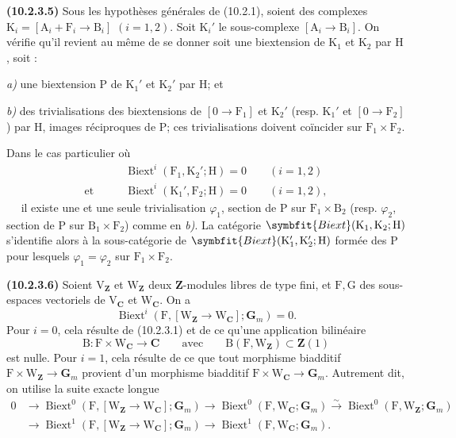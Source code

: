\documentclass[11pt,leqno]{article}
\newcommand{\Page}[1]{\ifvmode\noindent\else\unskip\ \fi{\footnotesize\textcolor{gray}{[p.\,#1]}}\ \ignorespaces}
\begin{document}
\textbf{(10.2.3.5)} Sous les hypothèses générales de (10.2.1), soient
des complexes
\(\mathrm{K}_i=[\mathrm{A}_i+\mathrm{F}_i\to\mathrm{B}_i]\)
\((i=1,2)\). Soit \(\mathrm{K}_i'\) le sous-complexe
\([\mathrm{A}_i\to\mathrm{B}_i]\). On vérifie qu’il revient au même
de se donner soit une biextension de \(\mathrm{K}_1\) et
\(\mathrm{K}_2\) par \(\mathrm{H}\), soit :

\noindent\textit{a)} une biextension \(\mathrm{P}\) de
\(\mathrm{K}_1'\) et \(\mathrm{K}_2'\) par \(\mathrm{H}\); et

\noindent\textit{b)} des trivialisations des biextensions de
\([0\to\mathrm{F}_1]\) et \(\mathrm{K}_2'\)
(resp. \(\mathrm{K}_1'\) et \([0\to\mathrm{F}_2]\)) par
\(\mathrm{H}\), images réciproques de \(\mathrm{P}\); ces
trivialisations doivent coïncider sur
\(\mathrm{F}_1\times\mathrm{F}_2\).

Dans le cas particulier où
\begin{align*}
&\operatorname{Biext}^{i}(\mathrm{F}_1,\mathrm{K}_2';\mathrm{H})=0
\qquad(i=1,2)\\
\text{et}\qquad&
\operatorname{Biext}^{i}(\mathrm{K}_1',\mathrm{F}_2;\mathrm{H})=0
\qquad(i=1,2),
\end{align*}
\Page{62}
il existe une et une seule trivialisation \(\varphi_1\), section de
\(\mathrm{P}\) sur \(\mathrm{F}_1\times\mathrm{B}_2\)
(resp. \(\varphi_2\), section de \(\mathrm{P}\) sur
\(\mathrm{B}_1\times\mathrm{F}_2\)) comme en \textit{b)}.
La catégorie
\(\symbfit{Biext}(\mathrm{K}_1,\mathrm{K}_2;\mathrm{H})\)
s’identifie alors à la sous-catégorie de
\(\symbfit{Biext}(\mathrm{K}_1',\mathrm{K}_2';\mathrm{H})\)
formée des \(\mathrm{P}\) pour lesquels \(\varphi_1=\varphi_2\)
sur \(\mathrm{F}_1\times\mathrm{F}_2\).

\textbf{(10.2.3.6)} Soient \(\mathrm{V}_{\mathbf{Z}}\) et
\(\mathrm{W}_{\mathbf{Z}}\) deux \(\mathbf{Z}\)-modules libres de
type fini, et \(\mathrm{F},\mathrm{G}\) des sous-espaces vectoriels
de \(\mathrm{V}_{\mathbf{C}}\) et \(\mathrm{W}_{\mathbf{C}}\). On a
\[
\operatorname{Biext}^{i}(\mathrm{F},
[\mathrm{W}_{\mathbf{Z}}\to\mathrm{W}_{\mathbf{C}}];\mathbf{G}_m)=0.
\]
Pour \(i=0\), cela résulte de (10.2.3.1) et de ce qu’une application
bilinéaire
\[
\mathrm{B}:\mathrm{F}\times\mathrm{W}_{\mathbf{C}}\to\mathbf{C}
\qquad\text{avec}\qquad
\mathrm{B}(\mathrm{F},\mathrm{W}_{\mathbf{Z}})\subset\mathbf{Z}(1)
\]
est nulle. Pour \(i=1\), cela résulte de ce que tout morphisme
biadditif
\(\mathrm{F}\times\mathrm{W}_{\mathbf{Z}}\to\mathbf{G}_m\)
provient d’un morphisme biadditif
\(\mathrm{F}\times\mathrm{W}_{\mathbf{C}}\to\mathbf{G}_m\).
Autrement dit, on utilise la suite exacte longue
\[
\begin{aligned}
0&\to\operatorname{Biext}^{0}(\mathrm{F},
[\mathrm{W}_{\mathbf{Z}}\to\mathrm{W}_{\mathbf{C}}];\mathbf{G}_m)
\to\operatorname{Biext}^{0}(\mathrm{F},\mathrm{W}_{\mathbf{C}};\mathbf{G}_m)
\xrightarrow{\sim}
\operatorname{Biext}^{0}(\mathrm{F},\mathrm{W}_{\mathbf{Z}};\mathbf{G}_m)\\
&\to\operatorname{Biext}^{1}(\mathrm{F},
[\mathrm{W}_{\mathbf{Z}}\to\mathrm{W}_{\mathbf{C}}];\mathbf{G}_m)
\to\operatorname{Biext}^{1}(\mathrm{F},\mathrm{W}_{\mathbf{C}};\mathbf{G}_m).
\end{aligned}
\]
\end{document}
